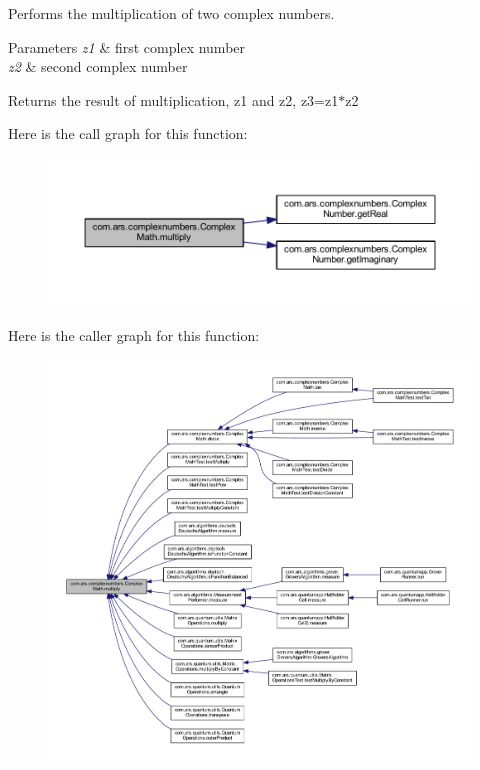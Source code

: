 Performs the multiplication of two complex numbers. 
\begin{DoxyParams}{Parameters}
{\em z1} & first complex number \\
\hline
{\em z2} & second complex number \\
\hline
\end{DoxyParams}
\begin{DoxyReturn}{Returns}
the result of multiplication, z1 and z2, z3=z1$\ast$z2 
\end{DoxyReturn}
Here is the call graph for this function\+:
\nopagebreak
\begin{figure}[H]
\begin{center}
\leavevmode
\includegraphics[width=350pt]{classcom_1_1ars_1_1complexnumbers_1_1_complex_math_a0283601c9ce6efc0636468ee5e65f299_cgraph}
\end{center}
\end{figure}
Here is the caller graph for this function\+:
\nopagebreak
\begin{figure}[H]
\begin{center}
\leavevmode
\includegraphics[width=350pt]{classcom_1_1ars_1_1complexnumbers_1_1_complex_math_a0283601c9ce6efc0636468ee5e65f299_icgraph}
\end{center}
\end{figure}
\hypertarget{classcom_1_1ars_1_1complexnumbers_1_1_complex_math_aea5e553e5a5e3e519df64cb155699198}{}\label{classcom_1_1ars_1_1complexnumbers_1_1_complex_math_aea5e553e5a5e3e519df64cb155699198} 
